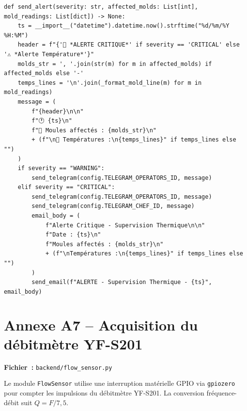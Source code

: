 \begin{lstlisting}
def send_alert(severity: str, affected_molds: List[int], mold_readings: List[dict]) -> None:
    ts = __import__("datetime").datetime.now().strftime("%d/%m/%Y %H:%M")
    header = f"{'🔴 *ALERTE CRITIQUE*' if severity == 'CRITICAL' else '⚠️ *Alerte Température*'}"
    molds_str = ', '.join(str(m) for m in affected_molds) if affected_molds else '-'
    temps_lines = '\n'.join(_format_mold_line(m) for m in mold_readings)
    message = (
        f"{header}\n\n"
        f"🕐 {ts}\n"
        f"🔸 Moules affectés : {molds_str}\n"
        + (f"\n🔸 Températures :\n{temps_lines}" if temps_lines else "")
    )
    if severity == "WARNING":
        send_telegram(config.TELEGRAM_OPERATORS_ID, message)
    elif severity == "CRITICAL":
        send_telegram(config.TELEGRAM_OPERATORS_ID, message)
        send_telegram(config.TELEGRAM_CHEF_ID, message)
        email_body = (
            f"Alerte Critique - Supervision Thermique\n\n"
            f"Date : {ts}\n"
            f"Moules affectés : {molds_str}\n"
            + (f"\nTempératures :\n{temps_lines}" if temps_lines else "")
        )
        send_email(f"ALERTE - Supervision Thermique - {ts}", email_body)
\end{lstlisting}

\section{Annexe A7 -- Acquisition du débitmètre YF-S201}
\label{annexe:flow}

\textbf{Fichier~:} \texttt{backend/flow\_sensor.py}

Le module \texttt{FlowSensor} utilise une interruption matérielle GPIO via \texttt{gpiozero} pour compter les impulsions du débitmètre YF-S201. La conversion fréquence-débit suit \(Q = F / 7,5\).

